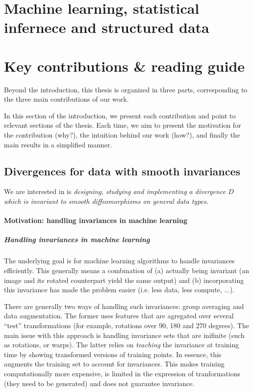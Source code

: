 
\section{Machine learning, statistical infernece and structured data}


\section{Key contributions \& reading guide}

Beyond the introduction, this thesis is organized in three parts, corresponding to the three main contributions of our work.

In this section of the introduction, we present each contribution and point to relevant sections of the thesis. Each time, we aim to present the motivation for the contribution (why?), the intuition behind our work (how?), and finally the main results in a simplified manner.

\newpage
\subsection{Divergences for data with smooth invariances}

We are interested in is \emph{designing, studying and implementing a divergence $D$ which is invariant to smooth diffeomorphisms on general data types.}

\paragraph{Motivation: handling invariances in machine learning}

\subparagraph{Handling invariances in machine learning}
The underlying goal is for machine learning algorithms to handle invariances efficiently. This generally means a combination of (a) actually being invariant (an image and its rotated counterpart yield the same output) and (b) incorporating this invariance has made the problem easier (i.e. less data, less compute, ...).

There are generally two ways of handling such invariances: group averaging and data augmentation. The former uses features that are agregated over several ``test'' transformations (for example, rotations over 90, 180 and 270 degrees). The main issue with this approach is handling invariance sets that are inifinite (such as rotations, or warps). The latter relies on \emph{teaching} the invariance at training time by showing transformed versions of training points. In essence, this augments the training set to account for invariances. This makes training computationally more expensive, is limited in the expression of tranformations (they need to be generated) and does not guarantee invariance.

